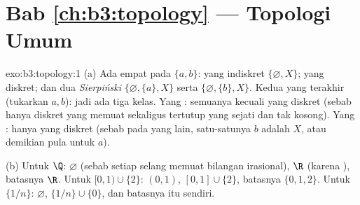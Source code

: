 \section*{Bab \ref{ch:b3:topology} --- Topologi Umum}

\begin{solution}{exo:b3:topology:1}
(a) Ada empat  pada $\{a,b\}$: yang indiskret
$\{\varnothing, X\}$; yang diskret; dan dua  \emph{Sierpiński}
$\{\varnothing, \{a\}, X\}$ serta $\{\varnothing,
\{b\}, X\}$. Kedua yang terakhir  (tukarkan $a, b$): jadi ada tiga
kelas. Yang : semuanya kecuali yang diskret (sebab hanya
 diskret yang memuat  sekaligus tertutup yang sejati dan tak kosong).
Yang : hanya yang diskret (sebab pada yang lain, satu-satunya
 $b$ adalah $X$, atau demikian pula untuk $a$).

(b) Untuk $\Q$:  $\varnothing$ (sebab setiap selang memuat
bilangan irasional),  $\R$ (karena ), batasnya $\R$. Untuk $[0,1)
\cup \{2\}$:  $(0,1)$,  $[0,1]\cup\{2\}$,
batasnya $\{0, 1, 2\}$. Untuk $\{1/n\}$:  $\varnothing$,
 $\{1/n\}\cup\{0\}$, dan batasnya  itu sendiri.
\end{solution}


